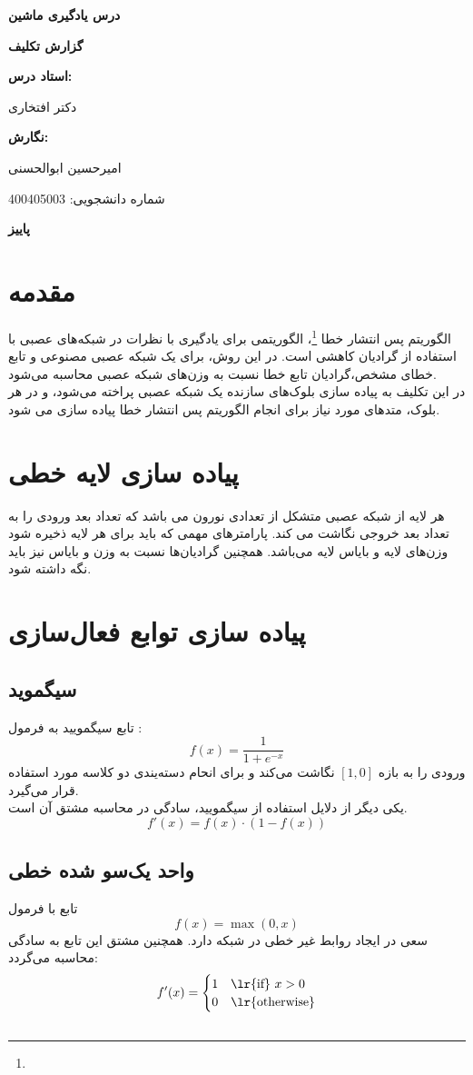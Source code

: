 \documentclass[11pt]{article}
\def\maketitle{
	\begin{titlepage}
		\begin{center}
			\vspace*{2cm}
			
			{\Large\bfseries درس یادگیری ماشین\par}
			\vspace{2cm}
			
			{\Huge\bfseries گزارش تکلیف
				\lr{Backpropagation}\par}
			\vspace{3cm}
			
			{\large\bfseries استاد درس:\par}
			{\large دکتر افتخاری\par}
			\vspace{1.5cm}
			
			{\large\bfseries نگارش:\par}
			{\large امیرحسین ابوالحسنی\par}
			{\large شماره دانشجویی: 400405003\par}
			\vspace{2cm}
			
			\vfill  %
			
			{\large\bfseries پاییز \lr{1403}}
			
		\end{center}
	\end{titlepage}
	\setcounter{page}{1}
}
\begin{document}
	\maketitle	
	\tableofcontents
	\newpage
	\section{مقدمه}
	الگوریتم پس انتشار خطا
	\footnote{}،
	الگوریتمی برای یادگیری با نظرات در شبکه‌های عصبی با استفاده از گرادیان کاهشی است. در این روش، برای یک شبکه عصبی مصنوعی و تابع خطای مشخص،‌گرادیان تابع خطا نسبت به وزن‌های شبکه عصبی محاسبه می‌‌شود.\\
	در این تکلیف به پیاده سازی بلوک‌های سازنده یک شبکه عصبی پراخته می‌شود، و در هر بلوک، متد‌های مورد نیاز برای انجام الگوریتم پس انتشار خطا پیاده سازی می شود.
	\section{پیاده سازی لایه خطی}
	هر لایه از شبکه عصبی متشکل از تعدادی نورون می باشد که تعداد بعد ورودی را به تعداد بعد خروجی نگاشت می کند. پارامتر‌های مهمی که باید برای هر لایه ذخیره شود وزن‌های لایه‌ و بایاس لایه می‌باشد. همچنین گرادیان‌ها نسبت به وزن و بایاس نیز باید نگه داشته شود.\\
	\section{پیاده سازی توابع فعال‌سازی}
	\subsection{سیگموید}
	تابع سیگمویید به فرمول :
	\[ f(x) = \frac{1}{1 + e^{-x}} \]
	ورودی را به بازه $[1, 0]$ نگاشت می‌کند و برای انحام دسته‌یندی دو کلاسه مورد استفاده قرار می‌گیرد.\\
	یکی دیگر از دلایل استفاده از سیگمویید، سادگی در محاسبه مشتق آن است.
	\[ f'(x) = f(x)\cdot (1 - f(x)) \]
	\subsection{واحد یک‌سو شده خطی}
	تابع 
	با فرمول 
	\[ f(x) = \max (0, x )\]
	سعی در ایجاد روابط غیر خطی در شبکه دارد.
	همچنین مشتق این تابع به سادگی محاسبه می‌گردد:
	$$ f'(x) = \begin{cases} 1 & \text{\lr{if} } x > 0 \\ 0 & \text{\lr{otherwise}} \end{cases} $$
	\subsection{}
\end{document}
